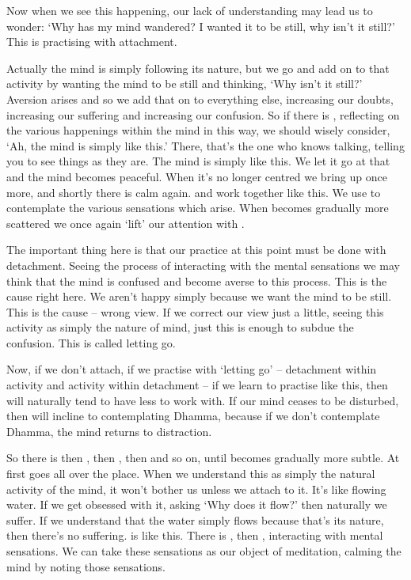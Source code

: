 Now when we see this happening, our lack of understanding may lead us to wonder: `Why has my mind wandered? I wanted it to be still, why isn't it still?' This is practising with attachment.

Actually the mind is simply following its nature, but we go and add on to that activity by wanting the mind to be still and thinking, `Why isn't it still?' Aversion arises and so we add that on to everything else, increasing our doubts, increasing our suffering and increasing our confusion. So if there is , reflecting on the various happenings within the mind in this way, we should wisely consider, `Ah, the mind is simply like this.' There, that's the one who knows talking, telling you to see things as they are. The mind is simply like this. We let it go at that and the mind becomes peaceful. When it's no longer centred we bring up  once more, and shortly there is calm again.  and  work together like this. We use  to contemplate the various sensations which arise. When  becomes gradually more scattered we once again `lift' our attention with .

The important thing here is that our practice at this point must be done with detachment. Seeing the process of  interacting with the mental sensations we may think that the mind is confused and become averse to this process. This is the cause right here. We aren't happy simply because we want the mind to be still. This is the cause -- wrong view. If we correct our view just a little, seeing this activity as simply the nature of mind, just this is enough to subdue the confusion. This is called letting go.

Now, if we don't attach, if we practise with `letting go' -- detachment within activity and activity within detachment -- if we learn to practise like this, then  will naturally tend to have less to work with. If our mind ceases to be disturbed, then  will incline to contemplating Dhamma, because if we don't contemplate Dhamma, the mind returns to distraction.

So there is  then ,  then ,  then  and so on, until  becomes gradually more subtle. At first  goes all over the place. When we understand this as simply the natural activity of the mind, it won't bother us unless we attach to it. It's like flowing water. If we get obsessed with it, asking `Why does it flow?' then naturally we suffer. If we understand that the water simply flows because that's its nature, then there's no suffering.  is like this. There is , then , interacting with mental sensations. We can take these sensations as our object of meditation, calming the mind by noting those sensations.

